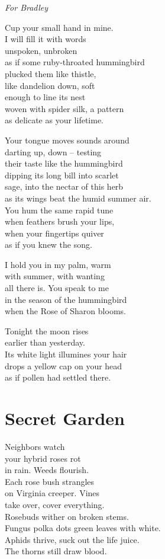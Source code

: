 \documentclass[twoside,10pt]{book}
\begin{document}
\emph{For Bradley}

Cup your small hand in mine.\\
I will fill it with words\\
unspoken, unbroken\\
as if some ruby-throated hummingbird\\
plucked them like thistle,\\
like dandelion down, soft\\
enough to line its nest\\
woven with spider silk, a pattern\\
as delicate as your lifetime.

Your tongue moves sounds around\\
darting up, down -- testing\\
their taste like the hummingbird\\
dipping its long bill into scarlet\\
sage, into the nectar of this herb\\
as its wings beat the humid summer air.\\
You hum the same rapid tune\\
when feathers brush your lips,\\
when your fingertips quiver\\
as if you knew the song.

I hold you in my palm, warm\\
with summer, with wanting\\
all there is. You speak to me\\
in the season of the hummingbird\\
when the Rose of Sharon blooms.

Tonight the moon rises\\
earlier than yesterday.\\
Its white light illumines your hair\\
drops a yellow cap on your head\\
as if pollen had settled there.


\clearpage
\section{Secret Garden}

Neighbors watch\\
your hybrid roses rot\\
in rain. Weeds flourish.\\
Each rose bush strangles\\
on Virginia creeper. Vines\\
take over, cover everything.\\
Rosebuds wither on broken stems.\\
Fungus polka dots green leaves with white.\\
Aphids thrive, suck out the life juice.\\
The thorns still draw blood.
\end{document}
